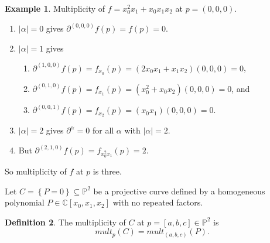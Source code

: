 \documentclass{article}
\newcommand{\C}{\mathbb{C}}
\renewcommand{\P}{\mathbb{P}}
\newcommand{\rb}[1]{\left( #1 \right)}
\renewcommand{\sb}[1]{\left[ #1 \right]}
\newcommand{\cb}[1]{\left\{ #1 \right\}}
\newcommand{\abs}[1]{\left\lvert #1 \right\rvert}
\theoremstyle{definition}\newtheorem{definition}{Definition}[section]
\theoremstyle{definition}\newtheorem{notation}[definition]{Notation}
\theoremstyle{definition}\newtheorem{remark}[definition]{Remark}
\theoremstyle{definition}\newtheorem{example}[definition]{Example}
\theoremstyle{definition}\newtheorem{fact}{Fact}
\theoremstyle{definition}\newtheorem{exercise}{Exercise}
\begin{document}
\begin{example}
Multiplicity of $ f = x_0^2x_1 + x_0x_1x_2 $ at $ p = \rb{0, 0, 0} $.
\begin{enumerate}
\item $ \abs{\alpha} = 0 $ gives $ \partial^{\rb{0, 0, 0}} f\rb{p} = f\rb{p} = 0 $.
\item $ \abs{\alpha} = 1 $ gives
\begin{enumerate}
\item $ \partial^{\rb{1, 0, 0}} f\rb{p} = f_{x_0}\rb{p} = \rb{2x_0x_1 + x_1x_2}\rb{0, 0, 0} = 0 $,
\item $ \partial^{\rb{0, 1, 0}} f\rb{p} = f_{x_1}\rb{p} = \rb{x_0^2 + x_0x_2}\rb{0, 0, 0} = 0 $, and
\item $ \partial^{\rb{0, 0, 1}} f\rb{p} = f_{x_2}\rb{p} = \rb{x_0x_1}\rb{0, 0, 0} = 0 $.
\end{enumerate}
\item $ \abs{\alpha} = 2 $ gives $ \partial^\alpha = 0 $ for all $ \alpha $ with $ \abs{\alpha} = 2 $.
\item But $ \partial^{\rb{2, 1, 0}} f\rb{p} = f_{x_0^2x_1}\rb{p} = 2 $.
\end{enumerate}
So multiplicity of $ f $ at $ p $ is three.
\end{example}

Let $ C = \cb{P = 0} \subseteq \P^2 $ be a projective curve defined by a homogeneous polynomial $ P \in \C\sb{x_0, x_1, x_2} $ with no repeated factors.

\begin{definition}
The multiplicity of $ C $ at $ p = \sb{a, b, c} \in \P^2 $ is
$$ mult_p\rb{C} = mult_{\rb{a, b, c}}\rb{P}. $$
\end{definition}
\end{document}
